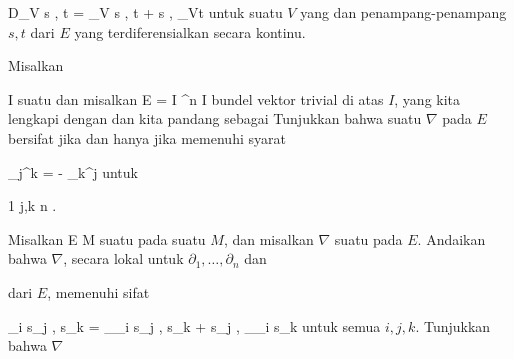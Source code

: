 \mavergleichskettedisp
{\vergleichskette
{ D_V \left\langle  s  , t  \right\rangle
}
{ =} { \left\langle \nabla_V s , t  \right\rangle  + \left\langle  s  ,  \nabla_Vt  \right\rangle
}
{ } {
}
{ } {
}
{ } {
}
}
{}{}{}
untuk suatu
$V$ yang
dan penampang-penampang $s,t$ dari $E$ yang terdiferensialkan secara kontinu.

{}
{

Misalkan

\mavergleichskette
{\vergleichskette
{ I
}
{ \subseteq }{ \R
}
{  }{
}
{    }{
}
{   }{
}
}
{}{}{}
suatu
dan misalkan
 {E = I \times \R^n } { I
} {}
bundel vektor trivial di atas $I$, yang kita lengkapi dengan
dan kita pandang sebagai
Tunjukkan bahwa suatu
$\nabla$ pada $E$ bersifat
jika dan hanya jika
memenuhi syarat
 {} {}

\mavergleichskettedisp
{\vergleichskette
{ \Gamma_j^k
}
{ =} { - \Gamma_k^j
}
{ } {
}
{ } {
}
{ } {
}
}
{}{}{}
untuk

\mavergleichskette
{\vergleichskette
{ 1
}
{ \leq }{ j,k
}
{ \leq }{ n
}
{    }{
}
{   }{
}
}
{}{}{.}

}
{} {}

{}
{

Misalkan
 { E } { M
} {}
suatu
pada suatu
$M$, dan misalkan $\nabla$ suatu
pada $E$. Andaikan bahwa $\nabla$, secara lokal untuk
$\partial_1  , \ldots , \partial_n$ dan

 dari $E$, memenuhi sifat

\mavergleichskettedisp
{\vergleichskette
{ \partial_i \left\langle  s_j  , s_k   \right\rangle
}
{ =} { \left\langle \nabla_{\partial_i } s_j   ,  s_k   \right\rangle  + \left\langle s_j  ,  \nabla_{\partial_i } s_k    \right\rangle
}
{ } {
}
{ } {
}
{ } {
}
}
{}{}{}
untuk semua $i,j,k$. Tunjukkan bahwa $\nabla$

}
{} {}

